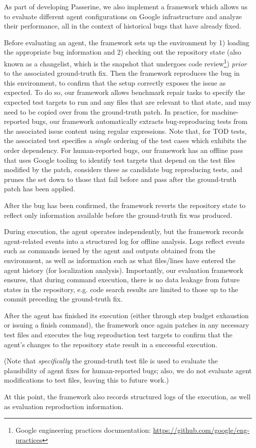 As part of developing Passerine, we also implement a framework which allows us to evaluate different agent configurations on Google infrastructure and analyze their performance, all in the context of historical bugs that have already fixed.




 Before evaluating an agent, the framework sets up the environment by 1) loading the appropriate bug information and 2) checking out the repository state (also known as a changelist, which is the snapshot that undergoes code review\footnote{Google engineering practices documentation: \url{https://github.com/google/eng-practices}}) \emph{prior} to the associated ground-truth fix. Then
the framework reproduces the bug in this environment, to confirm that the setup correctly exposes the issue as expected. To do so, our framework allows benchmark repair tasks to specify the expected test targets to run and any files that are relevant to that state, and may need to be copied over from the ground-truth patch.
In practice, for machine-reported bugs, our framework automatically extracts bug-reproducing tests from the associated issue content using regular expressions.
Note that, for TOD tests, the associated test specifies a \emph{single} ordering of the test cases which exhibits the order dependency.
For human-reported bugs,
our framework has an offline pass that uses Google
tooling to identify test targets that depend on the test
files modified by the patch, considers these as candidate 
bug reproducing tests, and prunes the set down to those
that fail before and pass after the ground-truth patch has
been applied.

After the bug has been confirmed, the framework reverts the repository state to reflect only information available before the ground-truth fix was produced.


 During execution, the agent operates independently, but the framework records agent-related events into a structured log for offline analysis. Logs reflect events such as commands issued by the agent and outputs obtained from the environment, as well as information such as what files/lines have entered the agent history (for localization analysis).
Importantly, our evaluation framework ensures, that during
command execution, there is no data leakage from future
states in the repository, e.g. code search results
are limited to those up to the commit preceding the ground-truth fix.

After the agent has finished its execution (either through step budget exhaustion or issuing a finish command), the framework once again patches in any necessary test files and executes the bug reproduction test targets to confirm that the agent’s changes to the repository state result in a successful execution. 

(Note that \emph{specifically} the ground-truth test file is used to evaluate the plausibility of agent fixes for human-reported bugs; also, we do not evaluate agent modifications to test files, leaving this to future work.)

At this point, the framework also records structured logs of the execution, as well as evaluation reproduction information.
